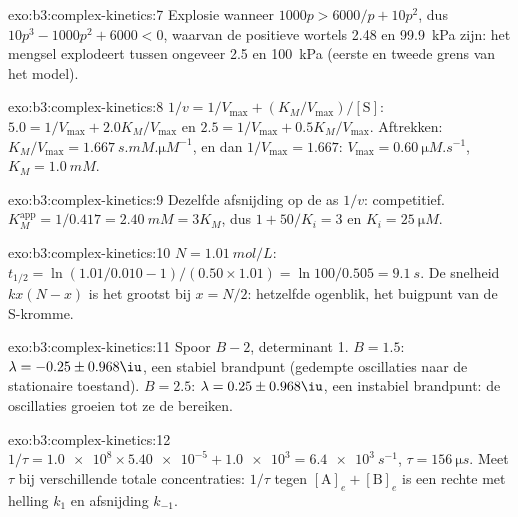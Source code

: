 \begin{solution}{exo:b3:complex-kinetics:7}
Explosie wanneer $1000p > 6000/p + 10p^2$, dus $10p^3 - 1000p^2 + 6000 < 0$,
waarvan de positieve wortels 2.48 en \qty{99.9}{kPa} zijn: het mengsel
explodeert tussen ongeveer 2.5 en
\qty{100}{kPa} (eerste en tweede grens van het model).
\end{solution}

\begin{solution}{exo:b3:complex-kinetics:8}
$1/v = 1/V_{\max} + (K_M/V_{\max})/[\mathrm S]$: $5.0 = 1/V_{\max} + 2.0K_M/V_{\max}$ en $2.5 = 1/V_{\max} + 0.5K_M/V_{\max}$.
Aftrekken: $K_M/V_{\max} = \qty{1.667}{s.mM.\micro M^{-1}}$, en dan $1/V_{\max} = 1.667$: $V_{\max} = \qty{0.60}{\micro M.s^{-1}}$,
$K_M = \qty{1.0}{mM}$.
\end{solution}

\begin{solution}{exo:b3:complex-kinetics:9}
Dezelfde afsnijding op de as $1/v$: competitief. $K_M^{\mathrm{app}} = 1/0.417 = \qty{2.40}{mM} = 3K_M$, dus
$1 + 50/K_i = 3$ en $K_i = \qty{25}{\micro M}$.
\end{solution}

\begin{solution}{exo:b3:complex-kinetics:10}
$N = \qty{1.01}{mol/L}$: $t_{1/2} = \ln(1.01/0.010 - 1)/(0.50 \times 1.01) = \ln100/0.505 = \qty{9.1}{s}$. De
snelheid $kx(N - x)$ is het grootst bij $x = N/2$: hetzelfde ogenblik, het
buigpunt van de S-kromme.
\end{solution}

\begin{solution}{exo:b3:complex-kinetics:11}
Spoor $B - 2$, determinant 1. $B = 1.5$: $\lambda = -0.25 \pm 0.968\iu$, een
stabiel brandpunt (gedempte oscillaties naar de stationaire toestand). $B = 2.5$: $\lambda = 0.25 \pm 0.968\iu$, een
instabiel brandpunt: de oscillaties groeien tot ze de  bereiken.
\end{solution}

\begin{solution}{exo:b3:complex-kinetics:12}
$1/\tau = \num{1.0e8} \times \num{5.40e-5} + \num{1.0e3} = \qty{6.4e3}{s^{-1}}$, $\tau = \qty{156}{\micro s}$. Meet $\tau$ bij
verschillende totale concentraties: $1/\tau$ tegen $[\mathrm A]_e + [\mathrm B]_e$ is een rechte met helling $k_1$ en
afsnijding $k_{-1}$.
\end{solution}

